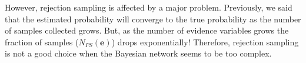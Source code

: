 However, rejection sampling is affected by a major problem. Previously, we said that the estimated probability will converge to the true probability as the number of samples
collected grows. But, as the number of evidence variables grows the fraction of samples ($N_{PS}(\mathbf{e})$) drops exponentially! Therefore, rejection sampling is not 
a good choice when the Bayesian network seems to be too complex.
